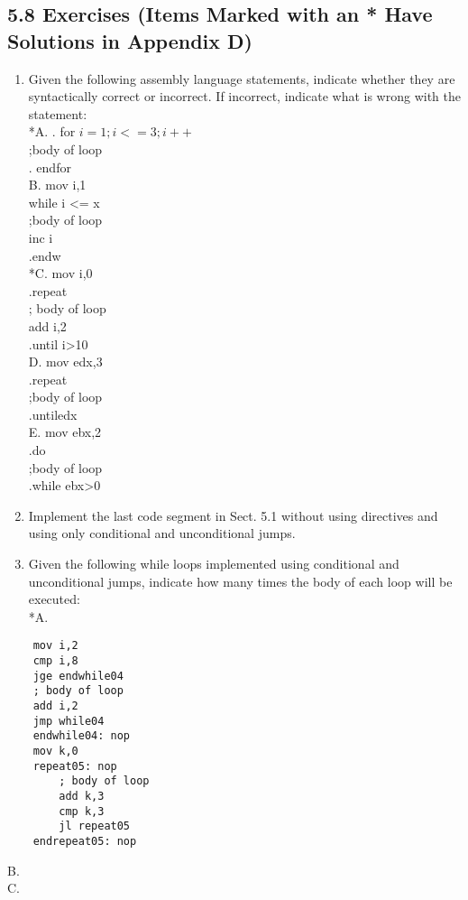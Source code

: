 \documentclass[10pt]{article}
\begin{document}
\subsection*{5.8 Exercises (Items Marked with an * Have Solutions in Appendix D)}
\begin{enumerate}
  \item Given the following assembly language statements, indicate whether they are syntactically correct or incorrect. If incorrect, indicate what is wrong with the statement:\\
*A. . for $i=1 ; i<=3 ; i++$\\
;body of loop\\
. endfor\\
B. mov i,1\\
while i <= x\\
;body of loop\\
inc i\\
.endw\\
*C. mov i,0\\
.repeat\\
; body of loop\\
add i,2\\
.until i>10\\
D. mov edx,3\\
.repeat\\
;body of loop\\
.untiledx\\
E. mov ebx,2\\
.do\\
;body of loop\\
.while ebx>0
  \item Implement the last code segment in Sect. 5.1 without using directives and using only conditional and unconditional jumps.
  \item Given the following while loops implemented using conditional and unconditional jumps, indicate how many times the body of each loop will be executed:\\
*A.
\end{enumerate}

\begin{verbatim}
    mov i,2
    cmp i,8
    jge endwhile04
    ; body of loop
    add i,2
    jmp while04
    endwhile04: nop
    mov k,0
    repeat05: nop
        ; body of loop
        add k,3
        cmp k,3
        jl repeat05
    endrepeat05: nop
\end{verbatim}

B.\\
C.
\end{document}
